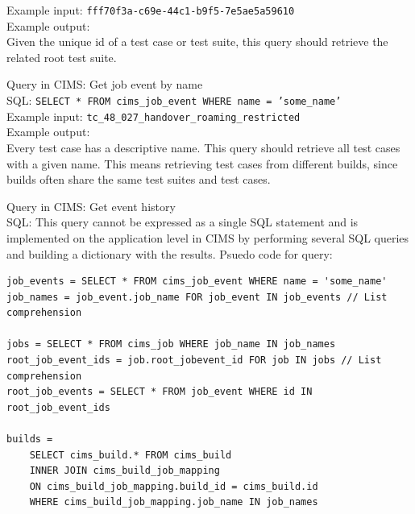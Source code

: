 {\begin{verbatim}
\end{verbatim}
Example input: {\tt fff70f3a-c69e-44c1-b9f5-7e5ae5a59610 } \\
Example output: \\
Given the unique id of a test case or test suite, this query should retrieve the related root test suite.

\label{q:gettcbyname}
Query in CIMS: Get job event by name \\
SQL: {\tt SELECT * FROM cims\_job\_event WHERE name = 'some\_name' } \\
Example input: {\tt tc\_48\_027\_handover\_roaming\_restricted } \\
Example output: \\
Every test case has a descriptive name. This query should retrieve all test cases with a given name. This means retrieving test cases from different builds, since builds often share the same test suites and test cases.


\label{q:tchistory}
Query in CIMS: Get event history \\
SQL: This query cannot be expressed as a single SQL statement and is implemented on the application level in CIMS by performing several SQL queries and building a dictionary with the results. Psuedo code for query:
\begin{verbatim}
job_events = SELECT * FROM cims_job_event WHERE name = 'some_name'
job_names = job_event.job_name FOR job_event IN job_events // List comprehension

jobs = SELECT * FROM cims_job WHERE job_name IN job_names
root_job_event_ids = job.root_jobevent_id FOR job IN jobs // List comprehension
root_job_events = SELECT * FROM job_event WHERE id IN root_job_event_ids

builds = 
    SELECT cims_build.* FROM cims_build
    INNER JOIN cims_build_job_mapping
    ON cims_build_job_mapping.build_id = cims_build.id
    WHERE cims_build_job_mapping.job_name IN job_names


\end{verbatim}}
